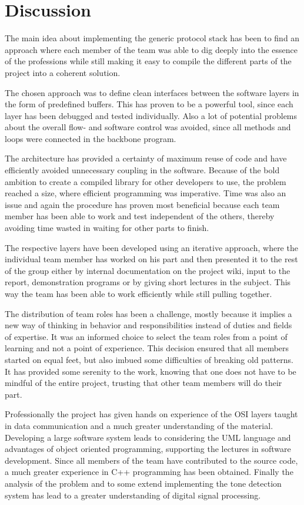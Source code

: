 \chapter{Discussion}\label{chap:discussion}
The main idea about implementing the generic protocol stack has been to find an approach
where each member of the team was able to dig deeply into the essence of the
professions while still making it easy to compile the different parts of the
project into a coherent solution.

The chosen approach was to define clean interfaces between the software layers
in the form of predefined buffers. This has proven to be a powerful tool, since
each layer has been debugged and tested individually. Also a lot of potential
problems about the overall flow- and software control was avoided, since all
methods and loops were connected in the backbone program.

The architecture has provided a certainty of maximum reuse of
code and have efficiently avoided unnecessary coupling in the software. Because
of the bold ambition to create a compiled library for other developers to use, the problem reached a
size, where efficient programming was imperative. Time was also an issue and
again the procedure has proven most beneficial because each team member has been
able to work and test independent of the others, thereby avoiding time wasted in
waiting for other parts to finish.

The respective layers have been developed using an iterative approach, where
the individual team member has worked on his part and then presented it to the rest
of the group either by internal documentation on the project wiki, input to the
report, demonstration programs or by giving short lectures in the subject. This
way the team has been able to work efficiently while still pulling together.

The distribution of team roles has been a challenge, mostly because it implies a
new way of thinking in behavior and responsibilities instead of duties and
fields of expertise. It was an informed choice to select the team roles from a
point of learning and not a point of experience. This decision ensured that
all members started on equal feet, but also imbued some difficulties of breaking
old patterns. It has provided some serenity to the work, knowing that one does
not have to be mindful of the entire project, trusting that other team members
will do their part.

Professionally the project has given hands on experience of the OSI layers
taught in data communication and a much greater understanding of the material.
Developing a large software system leads to considering the UML language and
advantages of object oriented programming, supporting the lectures in software
development. Since all members of the team have contributed to the source code,
a much greater experience in C++ programming has been obtained. Finally the
analysis of the problem and to some extend implementing the tone detection
system has lead to a greater understanding of digital signal processing.